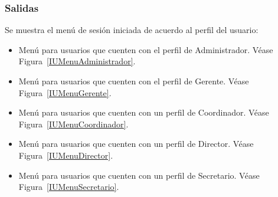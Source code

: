 \subsubsection{Salidas}
Se muestra el menú de sesión iniciada de acuerdo al perfil del usuario:
\begin{itemize}
 \item Menú para usuarios que cuenten con el perfil de Administrador. Véase Figura~\ref{IUMenuAdministrador}.

 \item Menú para usuarios que cuenten con el perfil de Gerente. Véase Figura~\ref{IUMenuGerente}.

 \item Menú para usuarios que cuenten con un perfil de Coordinador. Véase Figura~\ref{IUMenuCoordinador}.

 \item Menú para usuarios que cuenten con un perfil de Director. Véase Figura~\ref{IUMenuDirector}.
	
\item Menú para usuarios que cuenten con un perfil de Secretario. Véase Figura~\ref{IUMenuSecretario}.

\end{itemize}
















